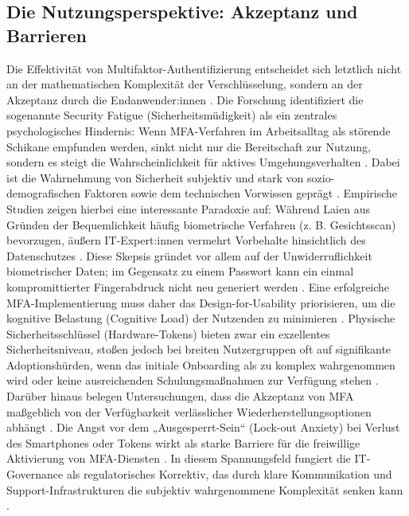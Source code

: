 \subsection{Die Nutzungsperspektive: Akzeptanz und Barrieren}
Die Effektivität von Multifaktor-Authentifizierung entscheidet sich letztlich nicht an der mathematischen Komplexität der Verschlüsselung, sondern an der Akzeptanz durch die Endanwender:innen \cite[S. 10]{1}. Die Forschung identifiziert die sogenannte {Security Fatigue} (Sicherheitsmüdigkeit) als ein zentrales psychologisches Hindernis: Wenn MFA-Verfahren im Arbeitsalltag als störende Schikane empfunden werden, sinkt nicht nur die Bereitschaft zur Nutzung, sondern es steigt die Wahrscheinlichkeit für aktives Umgehungsverhalten \cite[S. 1141]{1}. 
Dabei ist die Wahrnehmung von Sicherheit subjektiv und stark von sozio-demografischen Faktoren sowie dem technischen Vorwissen geprägt \cite[S. 349]{1}. Empirische Studien zeigen hierbei eine interessante Paradoxie auf: Während Laien aus Gründen der Bequemlichkeit häufig biometrische Verfahren (z. B. Gesichtsscan) bevorzugen, äußern IT-Expert:innen vermehrt Vorbehalte hinsichtlich des Datenschutzes \cite[S. 151]{1}. Diese Skepsis gründet vor allem auf der Unwiderruflichkeit biometrischer Daten; im Gegensatz zu einem Passwort kann ein einmal kompromittierter Fingerabdruck nicht neu generiert werden \cite[S. 151]{1}.
Eine erfolgreiche MFA-Implementierung muss daher das {Design-for-Usability} priorisieren, um die kognitive Belastung ({Cognitive Load}) der Nutzenden zu minimieren \cite[S. 1, 9]{1}. Physische Sicherheitsschlüssel (Hardware-Tokens) bieten zwar ein exzellentes Sicherheitsniveau, stoßen jedoch bei breiten Nutzergruppen oft auf signifikante Adoptionshürden, wenn das initiale {Onboarding} als zu komplex wahrgenommen wird oder keine ausreichenden Schulungsmaßnahmen zur Verfügung stehen \cite[S. 6, 46]{1}. 
Darüber hinaus belegen Untersuchungen, dass die Akzeptanz von MFA maßgeblich von der Verfügbarkeit verlässlicher Wiederherstellungsoptionen abhängt \cite[S. 3140]{1}. Die Angst vor dem „Ausgesperrt-Sein“ ({Lock-out Anxiety}) bei Verlust des Smartphones oder Tokens wirkt als starke Barriere für die freiwillige Aktivierung von MFA-Diensten \cite[S. 15]{1}. In diesem Spannungsfeld fungiert die IT-Governance als regulatorisches Korrektiv, das durch klare Kommunikation und Support-Infrastrukturen die subjektiv wahrgenommene Komplexität senken kann \cite[S. 4]{1}.

